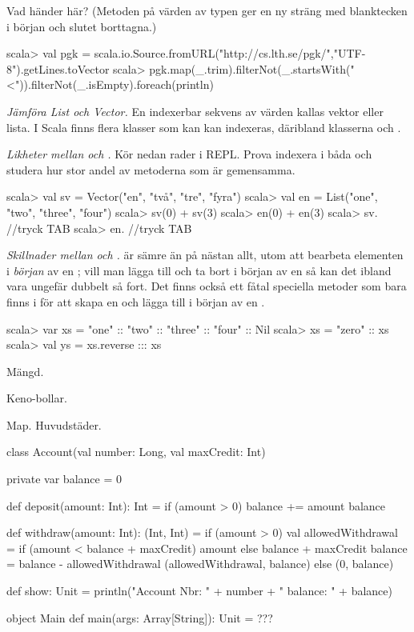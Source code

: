 \Subtask Vad händer här? (Metoden  på värden av typen  ger en ny sträng med blanktecken i början och slutet borttagna.) 
\begin{REPL}
scala> val pgk = scala.io.Source.fromURL("http://cs.lth.se/pgk/","UTF-8").getLines.toVector
scala> pgk.map(_.trim).filterNot(_.startsWith("<")).filterNot(_.isEmpty).foreach(println)
\end{REPL}



\Task \emph{Jämföra List och Vector.} En indexerbar sekvens av värden kallas vektor eller lista. I Scala finns flera klasser som kan kan indexeras, däribland klasserna  och . 

\Subtask \emph{Likheter mellan  och .} Kör nedan rader i REPL. Prova indexera i båda och studera hur stor andel av metoderna som är gemensamma.
\begin{REPL}
scala> val sv = Vector("en", "två", "tre", "fyra")
scala> val en = List("one", "two", "three", "four")
scala> sv(0) + sv(3)
scala> en(0) + en(3)
scala> sv. //tryck TAB 
scala> en. //tryck TAB
\end{REPL}

\Subtask \emph{Skillnader mellan  och .}  är sämre än  på nästan allt, utom att bearbeta elementen i \emph{början} av en ; vill man lägga till och ta bort i början av en  så kan det ibland vara ungefär dubbelt så fort. Det finns också ett fåtal speciella metoder som bara finns i  för att skapa en  och lägga till i början av en . 

\begin{REPL}
scala> var xs = "one" :: "two" :: "three" :: "four" :: Nil
scala> xs = "zero" :: xs
scala> val ys = xs.reverse ::: xs
\end{REPL}


\Task Mängd.

\Subtask Keno-bollar.


\Task Map. Huvudstäder.


\ExtraTasks %

\Task 

\begin{Code}
class Account(val number: Long, val maxCredit: Int){ 
  private var balance = 0
  
  def deposit(amount: Int): Int = { 
    if (amount > 0) {balance += amount}
    balance
  }
  
  def withdraw(amount: Int): (Int, Int) = if (amount > 0) { 
    val allowedWithdrawal = 
      if (amount < balance + maxCredit) amount 
      else balance + maxCredit 
    balance = balance - allowedWithdrawal
    (allowedWithdrawal, balance)
  } else (0, balance)
  
  def show: Unit = 
    println("Account Nbr: " + number + " balance: " + balance) 
}

object Main {
  def main(args: Array[String]): Unit = {
    ???
  }
}
\end{Code}

